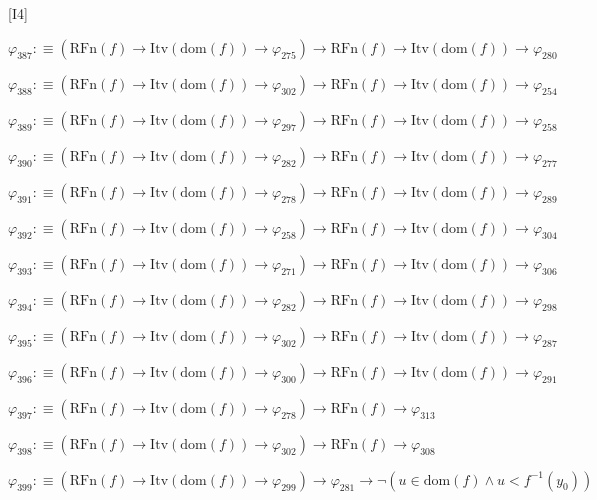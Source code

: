 \begin{fullproof}{[I4]}
\begin{abbrevlist}
\item $\varphi_{387} :\equiv (\mathrm{RFn}(f) \to \mathrm{Itv}(\mathrm{dom}(f)) \to \varphi_{275}) \to \mathrm{RFn}(f) \to \mathrm{Itv}(\mathrm{dom}(f)) \to \varphi_{280}$
\item $\varphi_{388} :\equiv (\mathrm{RFn}(f) \to \mathrm{Itv}(\mathrm{dom}(f)) \to \varphi_{302}) \to \mathrm{RFn}(f) \to \mathrm{Itv}(\mathrm{dom}(f)) \to \varphi_{254}$
\item $\varphi_{389} :\equiv (\mathrm{RFn}(f) \to \mathrm{Itv}(\mathrm{dom}(f)) \to \varphi_{297}) \to \mathrm{RFn}(f) \to \mathrm{Itv}(\mathrm{dom}(f)) \to \varphi_{258}$
\item $\varphi_{390} :\equiv (\mathrm{RFn}(f) \to \mathrm{Itv}(\mathrm{dom}(f)) \to \varphi_{282}) \to \mathrm{RFn}(f) \to \mathrm{Itv}(\mathrm{dom}(f)) \to \varphi_{277}$
\item $\varphi_{391} :\equiv (\mathrm{RFn}(f) \to \mathrm{Itv}(\mathrm{dom}(f)) \to \varphi_{278}) \to \mathrm{RFn}(f) \to \mathrm{Itv}(\mathrm{dom}(f)) \to \varphi_{289}$
\item $\varphi_{392} :\equiv (\mathrm{RFn}(f) \to \mathrm{Itv}(\mathrm{dom}(f)) \to \varphi_{258}) \to \mathrm{RFn}(f) \to \mathrm{Itv}(\mathrm{dom}(f)) \to \varphi_{304}$
\item $\varphi_{393} :\equiv (\mathrm{RFn}(f) \to \mathrm{Itv}(\mathrm{dom}(f)) \to \varphi_{271}) \to \mathrm{RFn}(f) \to \mathrm{Itv}(\mathrm{dom}(f)) \to \varphi_{306}$
\item $\varphi_{394} :\equiv (\mathrm{RFn}(f) \to \mathrm{Itv}(\mathrm{dom}(f)) \to \varphi_{282}) \to \mathrm{RFn}(f) \to \mathrm{Itv}(\mathrm{dom}(f)) \to \varphi_{298}$
\item $\varphi_{395} :\equiv (\mathrm{RFn}(f) \to \mathrm{Itv}(\mathrm{dom}(f)) \to \varphi_{302}) \to \mathrm{RFn}(f) \to \mathrm{Itv}(\mathrm{dom}(f)) \to \varphi_{287}$
\item $\varphi_{396} :\equiv (\mathrm{RFn}(f) \to \mathrm{Itv}(\mathrm{dom}(f)) \to \varphi_{300}) \to \mathrm{RFn}(f) \to \mathrm{Itv}(\mathrm{dom}(f)) \to \varphi_{291}$
\item $\varphi_{397} :\equiv (\mathrm{RFn}(f) \to \mathrm{Itv}(\mathrm{dom}(f)) \to \varphi_{278}) \to \mathrm{RFn}(f) \to \varphi_{313}$
\item $\varphi_{398} :\equiv (\mathrm{RFn}(f) \to \mathrm{Itv}(\mathrm{dom}(f)) \to \varphi_{302}) \to \mathrm{RFn}(f) \to \varphi_{308}$
\item $\varphi_{399} :\equiv (\mathrm{RFn}(f) \to \mathrm{Itv}(\mathrm{dom}(f)) \to \varphi_{299}) \to \varphi_{281} \to \neg (u \in \mathrm{dom}(f) \land u < f^{-1}(y_{0}))$

\end{abbrevlist}
\end{fullproof}
